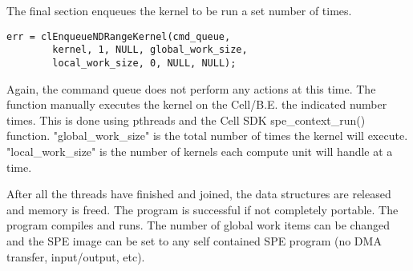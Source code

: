 The final section enqueues the kernel to be run a set number of times.
\begin{verbatim}
err = clEnqueueNDRangeKernel(cmd_queue,
        kernel, 1, NULL, global_work_size,
        local_work_size, 0, NULL, NULL);
\end{verbatim}
Again, the command queue does not perform any actions at this time. The function manually executes the kernel on the Cell/B.E. the indicated number times. This is done using pthreads and the Cell SDK spe\_context\_run() function. "global\_work\_size" is the total number of times the kernel will execute. "local\_work\_size" is the number of kernels each compute unit will handle at a time.

After all the threads have finished and joined, the data structures are released and memory is freed. The program is successful if not completely portable. The program compiles and runs. The number of global work items can be changed and the SPE image can be set to any self contained SPE program (no DMA transfer, input/output, etc).
